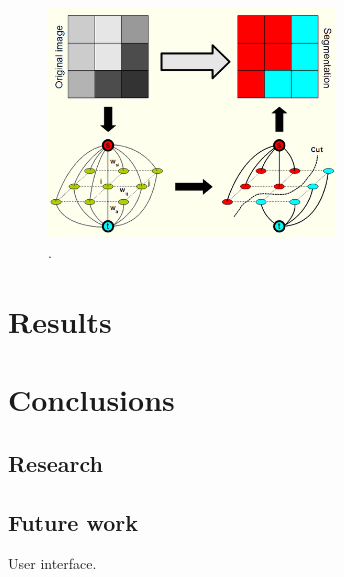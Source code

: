 \documentclass[a4paper,10pt]{article}
\begin{document}
\begin{figure}[H]
 \centering
 \includegraphics[width=3in]{graphcut.jpg}
 \caption{.}
\end{figure}


\newpage
\section{Results}
\subsection{}


\subsection{}


\subsection{}


\newpage
\section{Conclusions}
\subsection{Research}


\subsection{}


\subsection{Future work}
User interface.


\newpage

\end{document}
